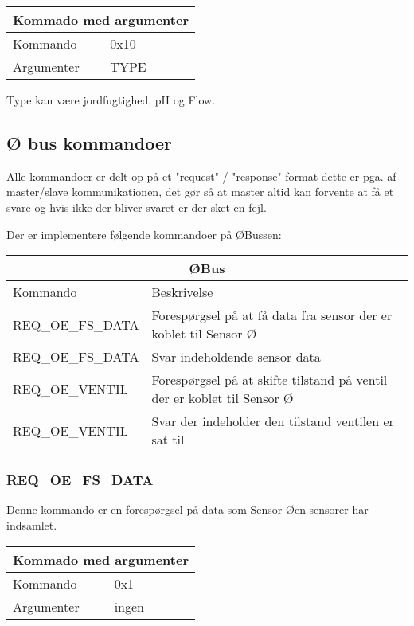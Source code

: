 \begin{table}[H]
\setlength{\parindent}{12pt}
\begin{tabular}{|l|lcc|}
\hline
\multicolumn{4}{|c|}{Kommado med argumenter}\\\hline
Kommando & 0x10 & & \\
Argumenter & TYPE & & \\\hline
\end{tabular}
\end{table}

Type kan være jordfugtighed, pH og Flow.

\subsection{Ø bus kommandoer}
Alle kommandoer er delt op på et "request" / "response" format dette er pga. af master/slave kommunikationen, det gør så at master altid kan forvente at få et svare og hvis ikke der bliver svaret er der sket en fejl.

Der er implementere følgende kommandoer på ØBussen:

\begin{table}[H]
\setlength{\parindent}{12pt}
\begin{tabular}{|l|l|}\hline
\multicolumn{2}{|c|}{ØBus\cellcolor[gray]{0.7}}\\\hline
Kommando & Beskrivelse \\\hline
REQ\_OE\_FS\_DATA 		& Forespørgsel på at få data fra sensor der er koblet til Sensor Ø \\\hline 
REQ\_OE\_FS\_DATA 		& Svar indeholdende sensor data								 \\\hline 
REQ\_OE\_VENTIL	   		& Forespørgsel på at skifte tilstand på ventil der er koblet til Sensor Ø \\\hline 
REQ\_OE\_VENTIL       		& Svar der indeholder den tilstand ventilen er sat til \\\hline 
\end{tabular}
\end{table}

\subsubsection{REQ\_OE\_FS\_DATA}
Denne kommando er en forespørgsel på data som Sensor Øen sensorer har indsamlet.

\begin{table}[H]
\setlength{\parindent}{12pt}
\begin{tabular}{|l|lcc|}
\hline
\multicolumn{4}{|c|}{Kommado med argumenter}\\\hline
Kommando & 0x1 & & \\
Argumenter & ingen & & \\\hline
\end{tabular}
\end{table}



